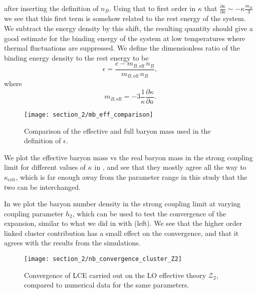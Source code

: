 %
after inserting the definition of $n_B$. Using that to first order in $\kappa$
that $\frac{\partial \kappa}{\partial a} \sim \minus{}\kappa \frac{m_B}{3}$ we see that
this first term is somehow related to the rest energy of the system. We subtract
the energy density by this shift, the resulting quantity should give a good estimate for the
binding energy of the system at low temperatures where thermal fluctuations are
suppressed. We define the dimensionless ratio of the binding energy density to
the rest energy to be
%
\begin{equation} \label{eq:epsilon_definition}
  \epsilon = \frac{e - m_{B,\text{eff}}\, n_B}{m_{B,\text{eff}}\, n_B},
\end{equation}
%
where
%
\begin{equation}
  m_{B,\text{eff}} = -3 \frac{1}{\kappa} \frac{\partial \kappa}{\partial a}.
\end{equation}
%
\begin{figure}[t]%
  {\centering%
    \texttt{[image: section\_2/mb\_eff\_comparison]}\par}
  \caption{Comparison of the effective and full baryon mass used in the definition of $\epsilon$.}%
  \label{fig:mb_eff_comparison}%
\end{figure}%
%
We plot the effective baryon mass vs the real baryon mass in the strong coupling
limit for different values of $\kappa$ in , and
see that they mostly agree all the way to $\kappa_{\mathrm{crit}}$, which is far
enough away from the parameter range in this study that the two can be
interchanged.

In  we plot the baryon number density in the
strong coupling limit at varying coupling parameter $h_2$, which can be used to
test the convergence of the expansion, similar to what we did in 
with  (left). We see that the higher order
linked cluster contribution has a small effect on the convergence, and that it
agrees with the results from the simulations.

\begin{figure}
  \begin{center}
    \texttt{[image: section\_2/nb\_convergence\_cluster\_Z2]}
  \end{center}
  \caption{Convergence of LCE carried out on the LO effective theory
    $\mathcal{Z}_2$, compared to numerical data for the same parameters.}
  \label{fig:convergence_cluster_Z2}
\end{figure}

